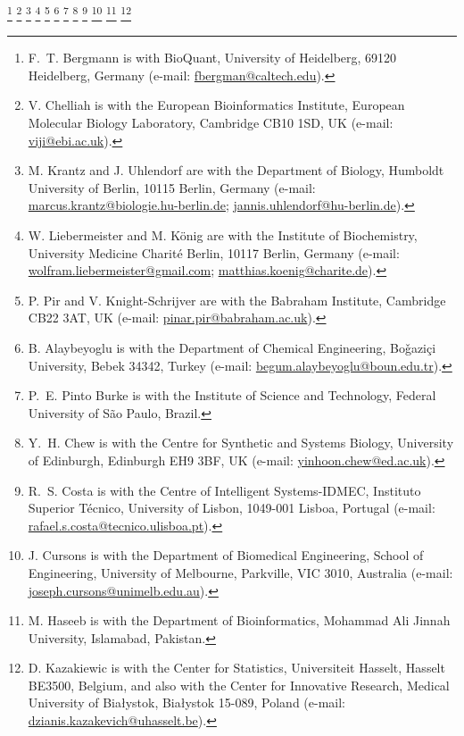 \documentclass[journal,transmag]{IEEEtran}
\newcommand{\email}[1]{\href{mailto:#1}{#1}}
\begin{document}
{    %
    \thanks{F.~T. Bergmann is with BioQuant, University of Heidelberg, 69120 Heidelberg, Germany (e-mail: \email{fbergman@caltech.edu}).} 
    \thanks{V. Chelliah is with the European Bioinformatics Institute, European Molecular Biology Laboratory, Cambridge CB10 1SD, UK (e-mail: \email{viji@ebi.ac.uk}).}  
    \thanks{M. Krantz and J. Uhlendorf are with the Department of Biology, Humboldt University of Berlin, 10115 Berlin, Germany (e-mail: \email{marcus.krantz@biologie.hu-berlin.de}; \email{jannis.uhlendorf@hu-berlin.de}).}
    \thanks{W. Liebermeister and M. K\"{o}nig are with the Institute of Biochemistry, University Medicine Charit\'{e} Berlin, 10117 Berlin, Germany (e-mail: \email{wolfram.liebermeister@gmail.com}; \email{matthias.koenig@charite.de}).}
    \thanks{P. Pir and V. Knight-Schrijver are with the Babraham Institute, Cambridge CB22 3AT, UK (e-mail: \email{pinar.pir@babraham.ac.uk}).}
    \thanks{B. Alaybeyoglu is with the Department of Chemical Engineering, Bo\v{g}azi\c{c}i University, Bebek 34342, Turkey (e-mail: \email{begum.alaybeyoglu@boun.edu.tr}).}
    \thanks{P.~E. Pinto Burke is with the Institute of Science and Technology, Federal University of São Paulo, Brazil.}
    \thanks{Y.~H. Chew is with the Centre for Synthetic and Systems Biology, University of Edinburgh, Edinburgh EH9 3BF, UK (e-mail: \email{yinhoon.chew@ed.ac.uk}).}
    \thanks{R.~S. Costa is with the Centre of Intelligent Systems-IDMEC, Instituto Superior Técnico, University of Lisbon, 1049-001 Lisboa, Portugal (e-mail: \email{rafael.s.costa@tecnico.ulisboa.pt}).}
    \thanks{J. Cursons is with the Department of Biomedical Engineering, School of Engineering, University of Melbourne, Parkville, VIC 3010, Australia (e-mail: \email{joseph.cursons@unimelb.edu.au}).}
    \thanks{M. Haseeb is with the Department of Bioinformatics, Mohammad Ali Jinnah University, Islamabad, Pakistan.}
    \thanks{D. Kazakiewic is with the Center for Statistics, Universiteit Hasselt, Hasselt BE3500, Belgium, and also with the Center for Innovative Research, Medical University of Białystok, Białystok 15-089, Poland (e-mail: \email{dzianis.kazakevich@uhasselt.be}).}
}
\end{document}
